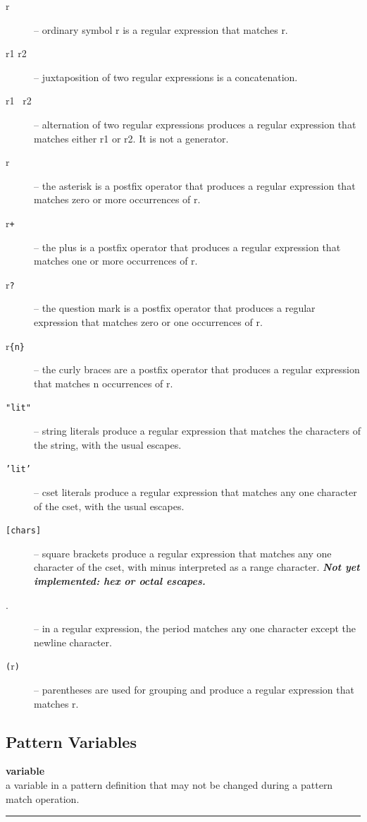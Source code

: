 \documentclass[letterpaper,12pt]{article}
\begin{document}
{\begin{description}
\item [r] -- ordinary symbol r is a regular expression that matches r.
\item [r1 r2] -- juxtaposition of two regular expressions is a concatenation.
\item [r1 {\tt \textbar} \ r2] -- alternation of two regular expressions
	produces a regular expression that matches either r1 or r2. It
	is not a generator.
\item [r{\tt *}] -- the asterisk is a postfix operator that produces a
	regular expression that matches zero or more occurrences of r.
\item [r{\tt +}] -- the plus is a postfix operator that produces a
	regular expression that matches one or more occurrences of r.
\item [r{\tt ?}] -- the question mark is a postfix operator that produces a
	regular expression that matches zero or one occurrences of r.
\item [r{\tt \{n\}}] -- the curly braces are a postfix operator that produces a
	regular expression that matches n occurrences of r.
\item [{\tt "lit"}] -- string literals produce a regular expression that
	matches the characters of the string, with the usual escapes.
\item [{\tt 'lit'}] -- cset literals produce a regular expression that
	matches any one character of the cset, with the usual escapes.
\item [{\tt {[}chars{]}}] -- square brackets produce a regular expression that
	matches any one character of the cset, with minus interpreted
	as a range character. {\em\bf Not yet implemented: hex
	or octal escapes.}
\item [.] -- in a regular expression, the period
	matches any one character except the newline character.
\item [{\tt (}r{\tt )}] -- parentheses are used for grouping and produce a
	regular expression that matches r.
\end{description}


\subsection*{Pattern Variables}

\noindent\textbf{variable} \\
a variable in a pattern definition that may not be changed during a pattern match operation.\\
\noindent\rule{16.5cm}{0.4pt}
 
}
\end{document}
